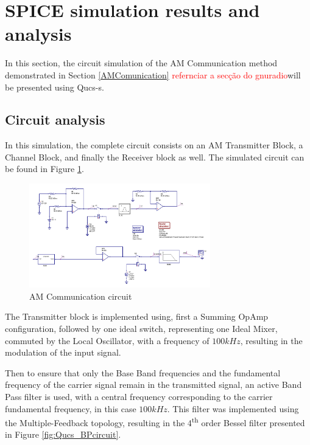 \section{SPICE simulation results and analysis}

In this section, the circuit simulation of the AM Communication method demonstrated in Section \ref{AMComunication} \textcolor{red}{refernciar a secção do gnuradio}will be presented using Qucs-s. 

\subsection{Circuit analysis}

In this simulation, the complete circuit consists on an AM Transmitter Block, a Channel Block, and finally the Receiver block as well. The simulated circuit can be found in Figure \ref{fig:Qucs_fullcircuit}.

\begin{figure}[H]
    \centering
    \includegraphics*[width=0.7\textwidth]{Images/Qucs_fullcircuit.png}
    \caption{AM Communication circuit}
    \label{fig:Qucs_fullcircuit}
\end{figure}

The Transmitter block is implemented using, first a Summing OpAmp configuration, followed by one ideal switch, representing one Ideal Mixer, commuted by the Local Oscillator, with a frequency of $100 kHz$, resulting in the modulation of the input signal. 

Then to ensure that only the Base Band frequencies and the fundamental frequency of the carrier signal remain in the transmitted signal, an active Band Pass filter is used, with a central frequency corresponding to the carrier fundamental frequency, in this case $100 kHz$. This filter was implemented using the Multiple-Feedback topology, resulting in the 4\textsuperscript{th} order Bessel filter presented in Figure \ref{fig:Qucs_BPcircuit}.


